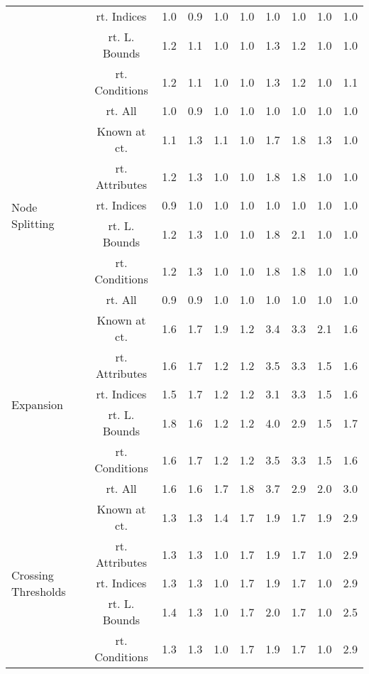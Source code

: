 \documentclass{article}
\begin{document}
\begin{longtable}{|p{2cm}||c|c|c|c|c|c|c|c|c|}
 & rt. Indices & 1.0 & 0.9 & 1.0 & 1.0 & 1.0 & 1.0 & 1.0 & 1.0\\ \cline{2-10}
 & rt. L. Bounds & 1.2 & 1.1 & 1.0 & 1.0 & 1.3 & 1.2 & 1.0 & 1.0\\ \cline{2-10}
 & rt. Conditions & 1.2 & 1.1 & 1.0 & 1.0 & 1.3 & 1.2 & 1.0 & 1.1\\ \cline{2-10}
 & rt. All & 1.0 & 0.9 & 1.0 & 1.0 & 1.0 & 1.0 & 1.0 & 1.0\\ \cline{2-10}
\hline
\multirow{6}{*}{ \parbox{2cm}{Node Splitting}} & Known at ct. & 1.1 & 1.3 & 1.1 & 1.0 & 1.7 & 1.8 & 1.3 & 1.0\\ \cline{2-10}
 & rt. Attributes & 1.2 & 1.3 & 1.0 & 1.0 & 1.8 & 1.8 & 1.0 & 1.0\\ \cline{2-10}
 & rt. Indices & 0.9 & 1.0 & 1.0 & 1.0 & 1.0 & 1.0 & 1.0 & 1.0\\ \cline{2-10}
 & rt. L. Bounds & 1.2 & 1.3 & 1.0 & 1.0 & 1.8 & 2.1 & 1.0 & 1.0\\ \cline{2-10}
 & rt. Conditions & 1.2 & 1.3 & 1.0 & 1.0 & 1.8 & 1.8 & 1.0 & 1.0\\ \cline{2-10}
 & rt. All & 0.9 & 0.9 & 1.0 & 1.0 & 1.0 & 1.0 & 1.0 & 1.0\\ \cline{2-10}
\hline
\multirow{6}{*}{ \parbox{2cm}{Expansion}} & Known at ct. & 1.6 & 1.7 & 1.9 & 1.2 & 3.4 & 3.3 & 2.1 & 1.6\\ \cline{2-10}
 & rt. Attributes & 1.6 & 1.7 & 1.2 & 1.2 & 3.5 & 3.3 & 1.5 & 1.6\\ \cline{2-10}
 & rt. Indices & 1.5 & 1.7 & 1.2 & 1.2 & 3.1 & 3.3 & 1.5 & 1.6\\ \cline{2-10}
 & rt. L. Bounds & 1.8 & 1.6 & 1.2 & 1.2 & 4.0 & 2.9 & 1.5 & 1.7\\ \cline{2-10}
 & rt. Conditions & 1.6 & 1.7 & 1.2 & 1.2 & 3.5 & 3.3 & 1.5 & 1.6\\ \cline{2-10}
 & rt. All & 1.6 & 1.6 & 1.7 & 1.8 & 3.7 & 2.9 & 2.0 & 3.0\\ \cline{2-10}
\hline
\multirow{6}{*}{ \parbox{2cm}{Crossing Thresholds}} & Known at ct. & 1.3 & 1.3 & 1.4 & 1.7 & 1.9 & 1.7 & 1.9 & 2.9\\ \cline{2-10}
 & rt. Attributes & 1.3 & 1.3 & 1.0 & 1.7 & 1.9 & 1.7 & 1.0 & 2.9\\ \cline{2-10}
 & rt. Indices & 1.3 & 1.3 & 1.0 & 1.7 & 1.9 & 1.7 & 1.0 & 2.9\\ \cline{2-10}
 & rt. L. Bounds & 1.4 & 1.3 & 1.0 & 1.7 & 2.0 & 1.7 & 1.0 & 2.5\\ \cline{2-10}
 & rt. Conditions & 1.3 & 1.3 & 1.0 & 1.7 & 1.9 & 1.7 & 1.0 & 2.9\\ \cline{2-10}

\end{longtable}
\end{document}
